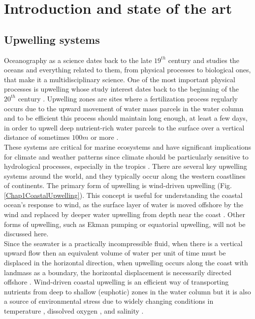 \chapter{Introduction and state of the art}\label{Chap1}

\clearpage
\section{Upwelling systems}\label{Chap1UpweSyst}

Oceanography as a science dates back to the late $19^{th}$ century \citep{Wust1964,Mill2012,LlopCowe2014} and studies the oceans and everything related to them, from physical processes to biological ones, that make it a multidisciplinary science. One of the most important physical processes is upwelling whose study interest dates back to the beginning of the $20^{th}$ century \citep{Ogil1912,Murp1920}. Upwelling zones are sites where a fertilization process regularly occurs due to the upward movement of water mass parcels in the water column and to be efficient this process should maintain long enough, at least a few days, in order to upwell deep nutrient-rich water parcels to the surface over a vertical distance of sometimes $100 m$ or more \citep{Marg1978}.\\

These systems are critical for marine ecosystems and have significant implications for climate and weather patterns since climate should be particularly sensitive to hydrological processes, especially in the tropics \citep{Webs1994}. There are several key upwelling systems around the world, and they typically occur along the western coastlines of continents. The primary form of upwelling is wind-driven upwelling (Fig. \ref{Chap1CoastalUpwelling}). This concept is useful for understanding the coastal ocean's response to wind, as the surface layer of water is moved offshore by the wind and replaced by deeper water upwelling from depth near the coast \citep{BrinHalp1983}. Other forms of upwelling, such as Ekman pumping or equatorial upwelling, will not be discussed here.\\

Since the seawater is a practically incompressible fluid, when there is a vertical upward flow then an equivalent volume of water per unit of time must be displaced in the horizontal direction, when upwelling occurs along the coast with landmass as a boundary, the horizontal displacement is necessarily directed offshore \citep{KampCap2}. Wind-driven coastal upwelling is an efficient way of transporting nutrients from deep to shallow (euphotic) zones in the water column \citep{MessChav2015,MessChav2017} but it is also a source of environmental stress due to widely changing conditions in temperature \citep{CastWang2014}, dissolved oxygen \citep{Scul2010}, and salinity \citep{XuanHuan2012}.\\

